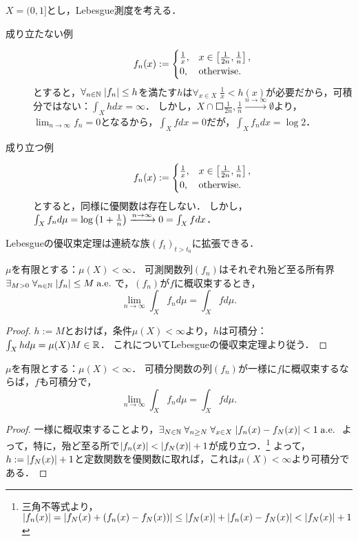 \documentclass[uplatex, dvipdfmx]{jsreport}
\begin{document}
\begin{remark}[優関数が取れない場合は定理が成立することもしないこともある]
    $X=(0,1]$とし，Lebesgue測度を考える．
    \begin{description}
        \item[成り立たない例] \[f_n(x):=\begin{cases}
            \frac{1}{x},&x\in\left[\frac{1}{2n},\frac{1}{n}\right],\\
            0,&\mathrm{otherwise}.
        \end{cases}\]とすると，$\forall_{n\in\mathbb{N}}\;\lvert f_n\rvert\le h$を満たす$h$は$\forall_{x\in X}\;\frac{1}{x}<h(x)$が必要だから，可積分ではない：$\int_Xhdx=\infty$．
        しかし，$X\cap\Square{\frac{1}{2n},\frac{1}{n}}\xrightarrow{n\to\infty}\emptyset$より，$\lim_{n\to\infty}f_n=0$となるから，$\int_Xfdx=0$だが，$\int_Xf_ndx=\log 2$．
        \item[成り立つ例]
        \[f_n(x):=\begin{cases}
            \frac{1}{x},&x\in\left[\frac{1}{2n},\frac{1}{n}\right],\\
            0,&\mathrm{otherwise}.
        \end{cases}\]とすると，同様に優関数は存在しない．
        しかし，$\int_Xf_nd\mu=\log\left(1+\frac{1}{n}\right)\xrightarrow{n\to\infty}0=\int_Xfdx$．
    \end{description}
\end{remark}
\begin{remark}[微分と積分との交換に向けて]
    Lebesgueの優収束定理は連続な族$(f_t)_{t>t_0}$に拡張できる．
\end{remark}

\begin{corollary}[有界関数列の積分は収束する]
    $\mu$を有限とする：$\mu(X)<\infty$．
    可測関数列$(f_n)$はそれぞれ殆ど至る所有界$\exists_{M>0}\;\forall_{n\in\mathbb{N}}\;\lvert f_n\rvert\le M\;\mathrm{a.e.}\;$で，$(f_n)$が$f$に概収束するとき，
    \[\lim_{n\to\infty}\int_Xf_nd\mu=\int_Xfd\mu.\]
\end{corollary}
\begin{proof}
    $h:=M$とおけば，条件$\mu(X)<\infty$より，$h$は可積分：$\int_Xhd\mu=\mu(X)M\in\mathbb{R}$．
    これについてLebesgueの優収束定理より従う．
\end{proof}

\begin{corollary}[一様収束する可積分関数列の積分は収束する]
    $\mu$を有限とする：$\mu(X)<\infty$．
    可積分関数の列$(f_n)$が一様に$f$に概収束するならば，$f$も可積分で，
    \[\lim_{n\to\infty}\int_Xf_nd\mu=\int_Xfd\mu.\]
\end{corollary}
\begin{proof}
    一様に概収束することより，$\exists_{N\in\mathbb{N}}\;\forall_{n\ge N}\;\forall_{x\in X}\;\lvert f_n(x)-f_N(x)\rvert<1\;\mathrm{a.e.}\;$
    よって，特に，殆ど至る所で$\lvert f_n(x)\rvert<\lvert f_N(x)\rvert+1$が成り立つ．\footnote{三角不等式より，$\lvert f_n(x)\rvert=\lvert f_N(x)+(f_n(x)-f_N(x))\rvert\le\lvert f_N(x)\rvert+\lvert f_n(x)-f_N(x)\rvert<\lvert f_N(x)\rvert+1$}
    よって，$h:=\lvert f_N(x)\rvert+1$と定数関数を優関数に取れば，これは$\mu(X)<\infty$より可積分である．
\end{proof}
\end{document}
